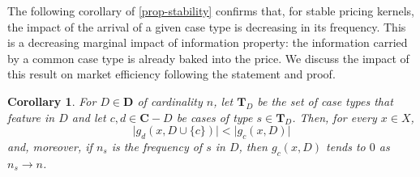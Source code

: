 \documentclass[ecta,nameyear,draft]{econsocart}
\newcommand{\bs}{-}%
\newcommand{\mbbd}{{\mathbf D}}
\newcommand{\mbbc}{{\mathbf C}}
\newcommand{\mbbt}{{\mathbf {T}}}
\theoremstyle{plain}
\newtheorem{corollary}{Corollary}[theorem]
\theoremstyle{remark}
\begin{document}
The following corollary of \cref{prop-stability} confirms that, for stable
pricing kernels, the impact of the arrival of a given case type is decreasing
in its frequency.  This is a decreasing marginal impact of information
property: the information carried by a common case type is already baked into
the price.  We discuss the impact of this result on market efficiency following
the statement and proof.
\begin{corollary}\label{cor-efficiency}
  For $D \in \mbbd$ of cardinality $n$, let $\mbbt_D$ be the set of case types
  that feature in $D$ and let $c, d \in \mbbc \bs D$ be cases of type $s \in
  \mbbt_D$. %
  Then, for every $x \in X$,
  \begin{equation*}
    \lvert g_{d}(x, D\cup \{c\}) \rvert < \lvert g_c(x, D)\rvert
  \end{equation*}
  and, moreover, if $n_s$ is the frequency of $s$ in $D$, then $g_c(x, D)$
  tends to $0$ as $n_s \rightarrow n$. 
\end{corollary}
\end{document}
